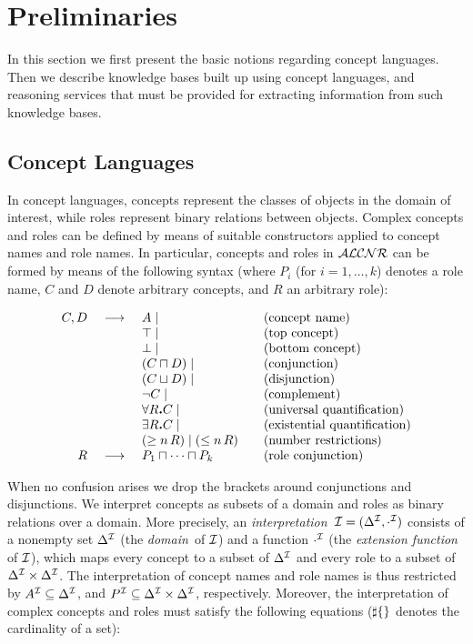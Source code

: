 \section{Preliminaries}\label{sec-preliminaries}

In this section we first present the basic notions regarding concept languages. 
Then we describe knowledge bases built up using concept languages, and reasoning
services that must be provided for extracting information from such knowledge
bases.
 
\subsection{Concept Languages}
In concept languages, concepts represent the
classes of objects in the domain of interest, while roles represent 
binary relations between objects. Complex concepts and roles can be 
defined by means of suitable constructors applied to concept names
and  role names. In particular,
concepts and roles in ${\cal ALCNR}$ can be formed by means of the following
syntax (where $P_i$ (for $i=1,\dots,k$) denotes a role name, $C$ and $D$
denote arbitrary concepts, and $R$ an arbitrary role):

\[ 
\begin{array}{rcl@{\qquad}l}
   C,D 	& \ \longrightarrow\ 	& A \mid   	& \mbox{(concept name)}\\ 
	& 			& \top \mid 	&	\mbox{(top concept)}      \\
        &                     	& \bot \mid 	& \mbox{(bottom concept)}   \\ 
      	&                     	& (C\AND D) \mid 	& \mbox{(conjunction)}     \\
        &                     	& (C\OR D) \mid 	& \mbox{(disjunction)}     \\
        &                     	& \NOT C \mid  	&\mbox{(complement)}       \\
	&  		& \ALLRC \mid 	&\mbox{(universal quantification)} \\ 
	&             	&  \SOME  R C\mid & \mbox{(existential quantification)}\\
	&		&\ATLEAST n R\mid \ATMOST n R& \mbox{(number restrictions)}\\
   R	& \ \longrightarrow\ 	& P_1\AND\cdots\AND P_k & \mbox{(role conjunction)}
\end{array} \]

When no confusion arises we drop the brackets around conjunctions 
and disjunctions.
We interpret concepts as subsets 
of a domain and roles as binary relations over a domain.
More precisely, an {\em interpretation\,} ${\cal I} = (\Delta^{\cal I}, \cdot^{\cal I})$ 
consists of a nonempty set $\Delta^{\cal I}$ (the {\em domain\,} of ${\cal I}$) and a function
$\cdot^{\cal I}$ (the {\em extension function\,} of ${\cal I}$),
which maps every concept to a subset of $\Delta^{\cal I}$
and every role to a subset of $\Delta^{\cal I}\times\Delta^{\cal I}$. The interpretation of concept 
names and role names is thus restricted by  $A^{\cal I} \subseteq \Delta^{\cal I}$, and 
$P^{\cal I} \subseteq \Delta^{\cal I}\times\Delta^{\cal I}$, respectively. Moreover, the interpretation
of complex concepts and roles must satisfy the following equations
($\sharp\{\}$ denotes the cardinality of a set):

